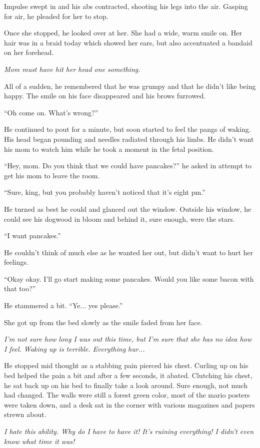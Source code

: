 \documentclass[9pt]{memoir}
\begin{document}
Impulse swept in and his abs contracted, shooting his legs into the air. Gasping for air, he pleaded for her to stop.

Once she stopped, he looked over at her. She had a wide, warm smile on. Her hair was in a braid today which showed her ears, but also accentuated a bandaid on her forehead.

\textit{Mom must have hit her head one something.}

All of a sudden, he remembered that he was grumpy and that he didn't like being happy. The smile on his face disappeared and his brows furrowed.

``Oh come on. What's wrong?''

He continued to pout for a minute, but soon started to feel the pangs of waking. His head began pounding and needles radiated through his limbs. He didn't want his mom to watch him while he took a moment in the fetal position.

``Hey, mom. Do you think that we could have pancakes?'' he asked in attempt to get his mom to leave the room.

``Sure, king, but you probably haven't noticed that it's eight pm.''

He turned as best he could and glanced out the window. Outside his window, he could see his dogwood in bloom and behind it, sure enough, were the stars.

``I want pancakes.''

He couldn't think of much else as he wanted her out, but didn't want to hurt her feelings.

``Okay okay. I'll go start making some pancakes. Would you like some bacon with that too?''

He stammered a bit. ``Ye... yes please.''

She got up from the bed slowly as the smile faded from her face.

\textit{I'm not sure how long I was out this time, but I'm sure that she has no idea how I feel. Waking up is terrible. Everything hur...}

He stopped mid thought as a stabbing pain pierced his chest. Curling up on his bed helped the pain a bit and after a few seconds, it abated. Clutching his chest, he sat back up on his bed to finally take a look around. Sure enough, not much had changed. The walls were still a forest green color, most of the mario posters were taken down, and a desk sat in the corner with various magazines and papers strewn about.

\textit{I hate this ability. Why do I have to have it! It's ruining everything! I didn't even know what time it was!}
\end{document}
